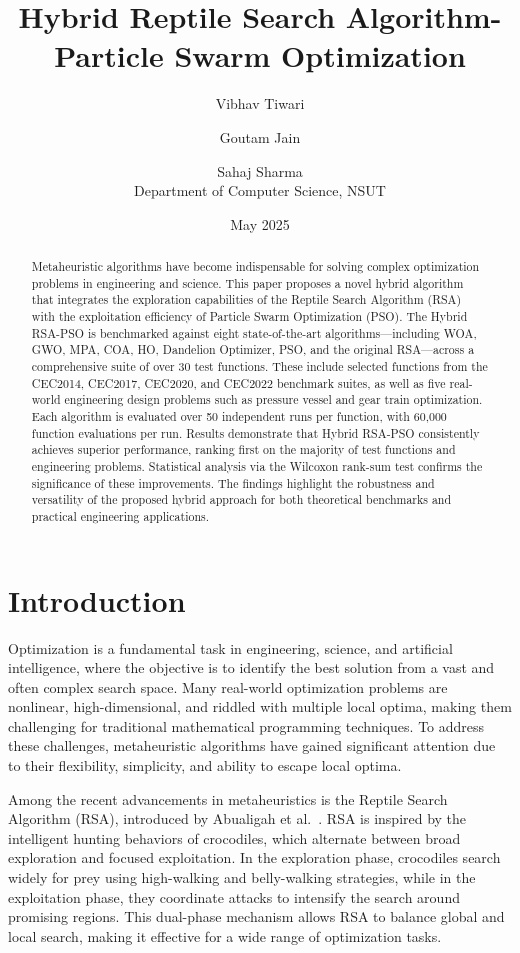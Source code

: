 \documentclass[12pt]{article}
\title{Hybrid Reptile Search Algorithm-Particle Swarm Optimization}
\author{Vibhav Tiwari \and Goutam Jain \and Sahaj Sharma \\
Department of Computer Science, NSUT}
\date{May 2025}
\begin{document}
\maketitle

\begin{abstract}
Metaheuristic algorithms have become indispensable for solving complex optimization problems in engineering and science. This paper proposes a novel hybrid algorithm that integrates the exploration capabilities of the Reptile Search Algorithm (RSA) with the exploitation efficiency of Particle Swarm Optimization (PSO). The Hybrid RSA-PSO is benchmarked against eight state-of-the-art algorithms---including WOA, GWO, MPA, COA, HO, Dandelion Optimizer, PSO, and the original RSA---across a comprehensive suite of over 30 test functions. These include selected functions from the CEC2014, CEC2017, CEC2020, and CEC2022 benchmark suites, as well as five real-world engineering design problems such as pressure vessel and gear train optimization. Each algorithm is evaluated over 50 independent runs per function, with 60,000 function evaluations per run. Results demonstrate that Hybrid RSA-PSO consistently achieves superior performance, ranking first on the majority of test functions and engineering problems. Statistical analysis via the Wilcoxon rank-sum test confirms the significance of these improvements. The findings highlight the robustness and versatility of the proposed hybrid approach for both theoretical benchmarks and practical engineering applications.
\end{abstract}

\tableofcontents

\section{Introduction}

Optimization is a fundamental task in engineering, science, and artificial intelligence, where the objective is to identify the best solution from a vast and often complex search space. Many real-world optimization problems are nonlinear, high-dimensional, and riddled with multiple local optima, making them challenging for traditional mathematical programming techniques. To address these challenges, metaheuristic algorithms have gained significant attention due to their flexibility, simplicity, and ability to escape local optima.

Among the recent advancements in metaheuristics is the Reptile Search Algorithm (RSA), introduced by Abualigah et al.~\cite{abualigah2022rsa}. RSA is inspired by the intelligent hunting behaviors of crocodiles, which alternate between broad exploration and focused exploitation. In the exploration phase, crocodiles search widely for prey using high-walking and belly-walking strategies, while in the exploitation phase, they coordinate attacks to intensify the search around promising regions. This dual-phase mechanism allows RSA to balance global and local search, making it effective for a wide range of optimization tasks.
\end{document}
